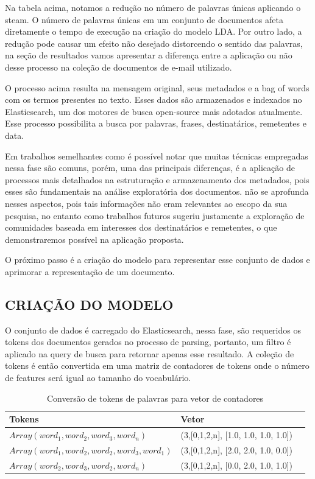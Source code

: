 \documentclass[12pt,a4paper]{article}
\begin{document}
\begin{enumerate}
Na tabela acima, notamos a redução no número de palavras únicas aplicando o steam. O número de palavras únicas em um conjunto de documentos afeta diretamente o tempo de execução na criação do modelo LDA. Por outro lado, a redução pode causar um efeito não desejado distorcendo o sentido das palavras, na seção de resultados vamos apresentar a diferença entre a aplicação ou não desse processo na coleção de documentos de e-mail utilizado.
\end{enumerate}


O processo acima resulta na mensagem original, seus metadados e a bag of words com os termos presentes no texto. Esses dados são armazenados e indexados no Elasticsearch, um dos motores de busca open-source mais adotados atualmente. Esse processo possibilita a busca por palavras, frases, destinatários, remetentes e data. 

Em trabalhos semelhantes como  é possível notar que muitas técnicas empregadas nessa fase são comuns, porém, uma das principais diferenças, é a aplicação de processos mais detalhados na estruturação e armazenamento dos metadados, pois esses são fundamentais na análise exploratória dos documentos.  não se aprofunda nesses aspectos, pois tais informações não eram relevantes ao escopo da sua pesquisa, no entanto como trabalhos futuros sugeriu justamente a exploração de comunidades baseada em interesses dos destinatários e remetentes, o que demonstraremos possível na aplicação proposta.

O próximo passo é a criação do modelo para representar esse conjunto de dados e aprimorar a representação de um documento.



\subsection{CRIAÇÃO DO MODELO}
O conjunto de dados é carregado do Elasticsearch, nessa fase, são requeridos os tokens dos documentos gerados no processo de parsing, portanto, um filtro é aplicado na query de busca para retornar apenas esse resultado. A coleção de tokens é então convertida em uma matriz de contadores de tokens onde o número de features será igual ao tamanho do vocabulário.


\begin{table}[h]
  \centering
  \begin{tabular}{l l l}
  Tokens		&Vetor &\\
  \hline
  $Array(word_1, word_2, word_3, word_n)$						&(3,[0,1,2,n], [1.0, 1.0, 1.0, 1.0]) &\\
  $Array(word_1, word_2, word_2, word_3, word_1)$				&(3,[0,1,2,n], [2.0, 2.0, 1.0, 0.0]) &\\
  $Array(word_2, word_3, word_2, word_n)$						&(3,[0,1,2,n], [0.0, 2.0, 1.0, 1.0]) &\\
  \hline
  \end{tabular}
  \caption{Conversão de tokens de palavras para vetor de contadores}
\end{table}
\end{document}
